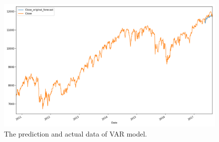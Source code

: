 \begin{figure}[H]
    \centering
    \begin{minipage}[b]{1\textwidth}
        \includegraphics[width=\textwidth]{manuscript/src/figures/Ass2/Ass2_Q4_Rolling_Forecast_vs_Actuals_of_close.png}
    \end{minipage}
    \caption{The prediction and actual data of VAR model.}
    \label{fig:Ass2_Q4_Rolling_Forecast_vs_Actuals_of_close}
\end{figure}